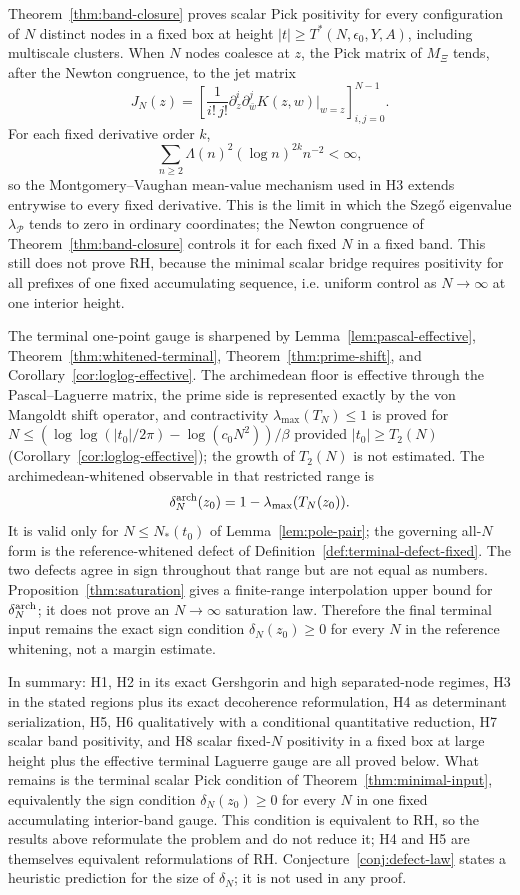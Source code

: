 \documentclass[11pt]{amsart}
\theoremstyle{definition}
\theoremstyle{remark}
\theoremstyle{definition}
\begin{document}
Theorem~\ref{thm:band-closure} proves scalar Pick positivity for every configuration of $N$ distinct
nodes in a fixed box at height $|t|\ge T^*(N,\epsilon_0,Y,A)$, including multiscale clusters.  When $N$ nodes coalesce at $z$,
the Pick matrix of $M_\Xi$ tends, after the Newton congruence, to the jet matrix
\[
   J_N(z)=
   \left[
      \frac1{i!\,j!}\partial_z^i\partial_{\bar w}^jK(z,w)\big|_{w=z}
   \right]_{i,j=0}^{N-1}.
\]
For each fixed derivative order $k$,
\[
   \sum_{n\ge2}\Lambda(n)^2(\log n)^{2k}n^{-2}<\infty,
\]
so the Montgomery--Vaughan mean-value mechanism used in H3 extends entrywise to every fixed derivative.
This is the limit in which the Szeg\H{o} eigenvalue $\lambda_{\mathcal P}$ tends to zero in ordinary
coordinates; the Newton congruence of Theorem~\ref{thm:band-closure} controls it for each fixed $N$ in
a fixed band.  This still does not prove RH, because the minimal scalar bridge requires positivity for
all prefixes of one fixed accumulating sequence, i.e. uniform control as $N\to\infty$ at one interior
height.

The terminal one-point gauge is sharpened by Lemma~\ref{lem:pascal-effective},
Theorem~\ref{thm:whitened-terminal}, Theorem~\ref{thm:prime-shift}, and
Corollary~\ref{cor:loglog-effective}.  The archimedean floor is effective through the
Pascal--Laguerre matrix, the prime side is represented exactly by the von Mangoldt shift operator, and
contractivity $\lambda_{\max}(T_N)\le1$ is proved for $N\le(\log\log(|t_0|/2\pi)-\log(c_0N^2))/\beta$
provided $|t_0|\ge T_2(N)$ (Corollary~\ref{cor:loglog-effective}); the growth of $T_2(N)$ is not
estimated.
The archimedean-whitened observable in that restricted range is
\[
   \delta_N^{\rm arch}(z_0)=1-\lambda_{\max}(T_N(z_0)).
\]
It is valid only for $N\le N_*(t_0)$ of
Lemma~\ref{lem:pole-pair}; the governing all-$N$ form is the reference-whitened defect of
Definition~\ref{def:terminal-defect-fixed}.  The two defects agree in sign throughout that range but
are not equal as numbers.
Proposition~\ref{thm:saturation} gives a finite-range interpolation upper bound for
$\delta_N^{\rm arch}$; it does not prove an $N\to\infty$ saturation law.  Therefore the final terminal
input remains the exact sign condition $\delta_N(z_0)\ge0$ for every $N$ in the reference whitening,
not a margin estimate.

In summary: H1, H2 in its exact Gershgorin and high separated-node regimes, H3 in the stated regions
plus its exact decoherence reformulation, H4 as determinant serialization, H5, H6 qualitatively with a
conditional quantitative reduction, H7 scalar band positivity, and H8
scalar fixed-$N$ positivity in a fixed box at large height plus the effective terminal Laguerre gauge are
all proved below. What remains is the terminal scalar Pick condition of
Theorem~\ref{thm:minimal-input}, equivalently the sign condition $\delta_N(z_0)\ge0$ for every $N$ in
one fixed accumulating interior-band gauge.  This condition is equivalent to RH, so the results above
reformulate the problem and do not reduce it; H4 and H5 are themselves equivalent reformulations of RH.
Conjecture~\ref{conj:defect-law} states a heuristic prediction for the size of $\delta_N$; it is not
used in any proof.
\end{document}
